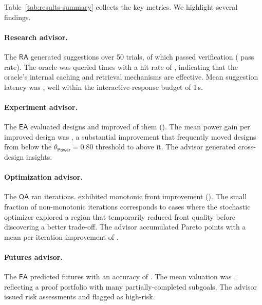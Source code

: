 \documentclass[11pt]{article}
\newcommand{\RA}{\mathsf{RA}}
\newcommand{\EA}{\mathsf{EA}}
\newcommand{\OA}{\mathsf{OA}}
\newcommand{\FA}{\mathsf{FA}}
\newcommand{\Power}{\mathsf{Power}}
\begin{document}
Table~\ref{tab:results-summary} collects the key metrics.  We
highlight several findings.

\paragraph{Research advisor.}
The $\RA$ generated \ppXCIsuggestionsGenerated{} suggestions
over 50 trials, of which \ppXCIsoundSuggestions{} passed
verification (\ppXCIverificationPassRate{} pass rate).  The
oracle was queried \ppXCIoracleQueries{} times with a hit rate
of \ppXCIoracleHitRate{}, indicating that the oracle's internal
caching and retrieval mechanisms are effective.  Mean suggestion
latency was \ppXCImeanSuggestionLatency{}, well within the
interactive-response budget of 1\,s.

\paragraph{Experiment advisor.}
The $\EA$ evaluated \ppXCIdesignsEvaluated{} designs and
improved \ppXCIdesignImprovements{} of them
(\ppXCIdesignImprovementRate{}).  The mean power gain per
improved design was \ppXCImeanPowerGain{}, a substantial
improvement that frequently moved designs from below the
$\theta_{\Power} = 0.80$ threshold to above it.  The advisor
generated \ppXCIinsightsGenerated{} cross-design insights.

\paragraph{Optimization advisor.}
The $\OA$ ran \ppXCIoptIterations{} iterations.
\ppXCIoptMonotonicRuns{} exhibited monotonic front improvement
(\ppXCIoptMonotonicity{}).  The small fraction of
non-monotonic iterations corresponds to cases where the
stochastic optimizer explored a region that temporarily reduced
front quality before discovering a better trade-off.  The
advisor accumulated \ppXCIoptParetoPoints{} Pareto points with
a mean per-iteration improvement of
\ppXCImeanFrontImprovement{}.

\paragraph{Futures advisor.}
The $\FA$ predicted \ppXCIfuturesPredicted{} futures with an
accuracy of \ppXCIfuturesAccuracy{}.  The mean valuation was
\ppXCImeanValuation{}, reflecting a proof portfolio with many
partially-completed subgoals.  The advisor issued
\ppXCIriskAssessments{} risk assessments and flagged
\ppXCIhighRiskFlagged{} as high-risk.
\end{document}
